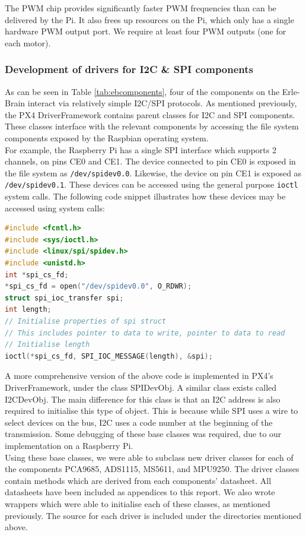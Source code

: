 \documentclass[capstone_report.tex]{subfiles}
\begin{document}
    The PWM chip provides significantly faster PWM frequencies than can be delivered by the Pi. It also frees up resources on the Pi, which only has a single hardware PWM output port. We require at least four PWM outputs (one for each motor).

    \subsubsection{Development of drivers for I2C \& SPI components}
    As can be seen in Table \ref{tab:ebcomponents}, four of the components on the Erle-Brain interact via relatively simple I2C/SPI protocols. As mentioned previously, the PX4 DriverFramework contains parent classes for I2C and SPI components. These classes interface with the relevant components by accessing the file system components exposed by the Raspbian operating system. \\

    For example, the Raspberry Pi has a single SPI interface which supports 2 channels, on pins CE0 and CE1. The device connected to pin CE0 is exposed in the file system as \texttt{/dev/spidev0.0}. Likewise, the device on pin CE1 is exposed as \texttt{/dev/spidev0.1}. These devices can be accessed using the general purpose \texttt{ioctl} system calls. The following code snippet illustrates how these devices may be accessed using system calls:

\begin{lstlisting}[language=c++]
#include <fcntl.h>
#include <sys/ioctl.h>     
#include <linux/spi/spidev.h>
#include <unistd.h>
int *spi_cs_fd;
*spi_cs_fd = open("/dev/spidev0.0", O_RDWR);
struct spi_ioc_transfer spi;
int length;
// Initialise properties of spi struct
// This includes pointer to data to write, pointer to data to read
// Initialise length
ioctl(*spi_cs_fd, SPI_IOC_MESSAGE(length), &spi);
\end{lstlisting}

    A more comprehensive version of the above code is implemented in PX4's DriverFramework, under the class SPIDevObj. A similar class exists called I2CDevObj. The main difference for this class is that an I2C address is also required to initialise this type of object. This is because while SPI uses a wire to select devices on the bus, I2C uses a code number at the beginning of the transmission. Some debugging of these base classes was required, due to our implementation on a Raspberry Pi. \\

    Using these base classes, we were able to subclass new driver classes for each of the components PCA9685, ADS1115, MS5611, and MPU9250. The driver classes contain methods which are derived from each components' datasheet. All datasheets have been included as appendices to this report. We also wrote wrappers which were able to initialise each of these classes, as mentioned previously. The source for each driver is included under the directories mentioned above.\\
\end{document}
